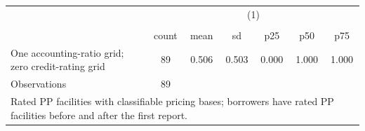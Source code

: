 {
\def\sym#1{\ifmmode^{#1}\else\(^{#1}\)\fi}
\begin{tabular}{l*{1}{cccccc}}
\hline\hline
                    &\multicolumn{6}{c}{(1)}                                                      \\
                    &\multicolumn{6}{c}{}                                                         \\
                    &       count&        mean&          sd&         p25&         p50&         p75\\
\hline
One accounting-ratio grid; zero credit-rating grid&          89&       0.506&       0.503&       0.000&       1.000&       1.000\\
\hline
Observations        &          89&            &            &            &            &            \\
\hline\hline
\multicolumn{7}{l}{\footnotesize Rated PP facilities with classifiable pricing bases; borrowers have rated PP facilities before and after the first report.}\\
\end{tabular}
}
